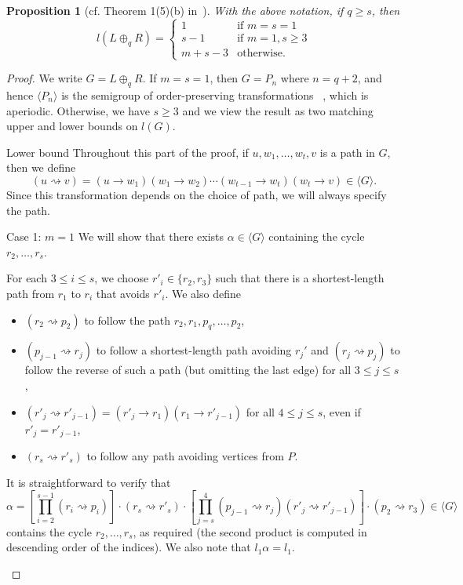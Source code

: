 \documentclass[10pt]{amsart}
\newtheorem{proposition}{Proposition}[section]
\newenvironment{enonce*}[2][]{\par\smallskip\noindent\textbf{#2}.\par\nobreak}{\par\smallskip}
\newcommand{\genset}[1]{\langle#1\rangle}
\begin{document}
\setcounter{section}{3}\setcounter{proposition}{5}
\begin{proposition}[cf. Theorem 1(5)(b) in~\cite{Horvath2017aa}] \label{prop:L+R}
 With the above notation, if $q \ge s$, then 
 \[
 l(L \oplus_q R) = \begin{cases}
 1 &\text{if } m = s = 1\\
 s - 1 &\text{if } m = 1, s \ge 3\\
 m + s - 3 & \text{otherwise.}
 \end{cases}
 \]
\end{proposition}
\begin{proof}
 We write $G = L \oplus_q R$. If $m=s=1$, then $G = P_n$ where $n = q+2$, and
 hence $\genset{P_n}$ is the semigroup of order-preserving transformations
~\cite{Aizenshtat1962aa}, which is aperiodic. Otherwise, we have $s \ge 3$ and we view the
 result as two matching upper and lower bounds on $l(G)$.

\begin{enonce*}[remark]{Lower bound} 
 Throughout this part of the proof, if $u, w_1, \ldots, w_t, v$ is a path in
 $G$, then we define \[(u\rightsquigarrow v)=(u\to w_1)(w_1\to
 w_2)\cdots(w_{t-1}\to w_t)(w_t\to v)\in\genset G.\] Since this transformation
 depends on the choice of path, we will always specify the path. 
\end{enonce*} 
 
\begin{enonce*}[remark]{Case 1: ${m = 1}$}
 We will show that there exists $\alpha \in \genset{G}$ containing the cycle
 $r_2, \dots, r_s$. 

 For each $3 \le i \le s$, we choose $r'_i\in \{r_2, r_3\}$ such that there
 is a shortest-length path from $r_1$ to $r_i$ that avoids $r'_i$. We also
 define
 \begin{itemize}
 \item 
 $(r_2 \rightsquigarrow p_2)$ to follow 
 the path $r_2, r_1, p_q, \ldots, p_2$,

 \item 
 $(p_{j - 1} \rightsquigarrow r_j)$ to follow a shortest-length path
 avoiding $r_j'$ and $(r_j\rightsquigarrow p_j)$ to follow the reverse of
 such a path (but omitting the last edge) for all $3 \leq j \leq s$,

 \item
 $(r'_j \rightsquigarrow r'_{j - 1}) = (r'_j \to r_1) (r_1 \to r'_{j -
 1})$ for all $4 \leq j \leq s$, even if $r'_j=r'_{j-1}$,

 \item
 $(r_s \rightsquigarrow r'_s)$ to follow any path avoiding vertices from
 $P$.
 \end{itemize}
 It is straightforward to verify that 
 \[
 \alpha = \left[
 \prod_{i = 2}^{s - 1} 
 (r_i \rightsquigarrow p_i)
 \right]
 \cdot 
 (r_s \rightsquigarrow r'_s) 
 \cdot 
 \left[
 \prod_{j = s} ^ {4} 
 (p_{j-1} \rightsquigarrow r_j)
 (r'_j \rightsquigarrow r'_{j-1}) 
 \right] 
 \cdot 
 (p_2 \rightsquigarrow r_3) \in\genset{G}
 \]
 contains the cycle $r_2, \dots, r_s$, as required (the second
 product is computed in descending order of the indices). We also note that
 $l_1\alpha=l_1$.
\end{enonce*}


\end{proof}
\end{document}
